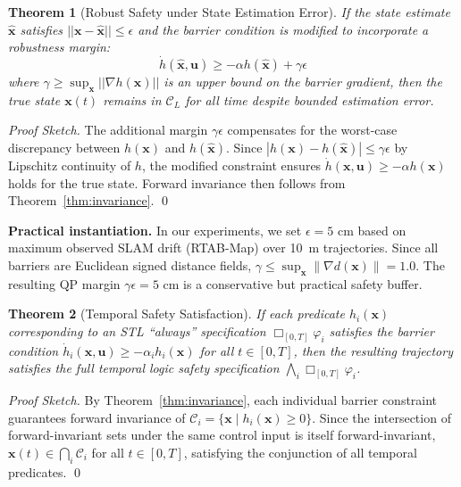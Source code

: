 \documentclass[conference]{IEEEtran}
\newtheorem{theorem}{Theorem}
\begin{document}
\begin{theorem}[Robust Safety under State Estimation Error]
\label{thm:robust}
If the state estimate $\hat{\mathbf{x}}$ satisfies $||\mathbf{x} - \hat{\mathbf{x}}|| \le \epsilon$ and the barrier condition is modified to incorporate a robustness margin:
\begin{equation}
\dot{h}(\hat{\mathbf{x}}, \mathbf{u}) \ge -\alpha h(\hat{\mathbf{x}}) + \gamma \epsilon
\end{equation}
where $\gamma \ge \sup_{\mathbf{x}} || \nabla h(\mathbf{x}) ||$ is an upper bound on the barrier gradient, then the true state $\mathbf{x}(t)$ remains in $\mathcal{C}_L$ for all time despite bounded estimation error.
\end{theorem}
\begin{proof}[Proof Sketch]
The additional margin $\gamma \epsilon$ compensates for the worst-case discrepancy between $h(\mathbf{x})$ and $h(\hat{\mathbf{x}})$. Since $|h(\mathbf{x}) - h(\hat{\mathbf{x}})| \le \gamma \epsilon$ by Lipschitz continuity of $h$, the modified constraint ensures $\dot{h}(\mathbf{x}, \mathbf{u}) \ge -\alpha h(\mathbf{x})$ holds for the true state. Forward invariance then follows from Theorem~\ref{thm:invariance}. \qed
\end{proof}

\noindent\textbf{Practical instantiation.} In our experiments, we set $\epsilon = 5$ cm based on maximum observed SLAM drift (RTAB-Map) over 10~m trajectories. Since all barriers are Euclidean signed distance fields, $\gamma \le \sup_{\mathbf{x}} \|\nabla d(\mathbf{x})\| = 1.0$. The resulting QP margin $\gamma \epsilon = 5$ cm is a conservative but practical safety buffer.

\begin{theorem}[Temporal Safety Satisfaction]
\label{thm:temporal}
If each predicate $h_i(\mathbf{x})$ corresponding to an STL ``always'' specification $\Box_{[0,T]} \varphi_i$ satisfies the barrier condition $\dot{h}_i(\mathbf{x}, \mathbf{u}) \ge -\alpha_i h_i(\mathbf{x})$ for all $t \in [0,T]$, then the resulting trajectory satisfies the full temporal logic safety specification $\bigwedge_i \Box_{[0,T]} \varphi_i$.
\end{theorem}
\begin{proof}[Proof Sketch]
By Theorem~\ref{thm:invariance}, each individual barrier constraint guarantees forward invariance of $\mathcal{C}_i = \{ \mathbf{x} \mid h_i(\mathbf{x}) \ge 0 \}$. Since the intersection of forward-invariant sets under the same control input is itself forward-invariant, $\mathbf{x}(t) \in \bigcap_i \mathcal{C}_i$ for all $t \in [0,T]$, satisfying the conjunction of all temporal predicates. \qed
\end{proof}
\end{document}
